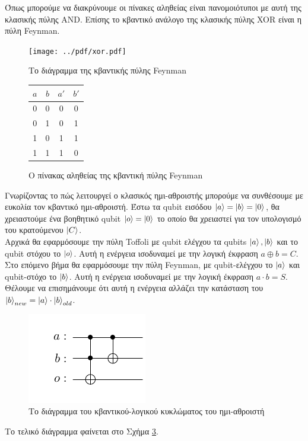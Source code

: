 Όπως μπορούμε να διακρύνουμε οι πίνακες αληθείας είναι πανομοιότυποι με
αυτή της κλασικής πύλης AND. Επίσης το κβαντικό ανάλογο της κλασικής πύλης
XOR είναι η πύλη Feynman.

\begin{figure}[ht]
    \centering
    \texttt{[image: ../pdf/xor.pdf]}
    \caption{Το διάγραμμα της κβαντικής πύλης Feynman}
    \label{fig:7}
\end{figure}

\begin{figure}[ht]
    \centering
    \begin{tabular}{c c|c c}
        $a$ & $b$ & $a'$ & $b'$ \\
        \hline
        0 & 0 & 0 & 0 \\
        0 & 1 & 0 & 1 \\
        1 & 0 & 1 & 1 \\
        1 & 1 & 1 & 0 \\
    \end{tabular}
    \caption{Ο πίνακας αληθείας της κβαντική πύλης Feynman}
    \label{fig:8}
\end{figure}

Γνωρίζοντας το πώς λειτουργεί ο κλασικός ημι-αθροιστής
μπορούμε να συνθέσουμε με ευκολία τον κβαντικό ημι-αθροιστή.
Έστω τα qubit εισόδου $\ket{a} = \ket{b} = \ket{0}$, θα χρειαστούμε
ένα βοηθητικό qubit $\ket{o} = \ket{0}$ το οποίο θα χρειαστεί για
τον υπολογισμό του κρατούμενου $\ket{C}$.\\

Αρχικά θα εφαρμόσουμε την πύλη Toffoli με qubit ελέγχου τα qubits
$\ket{a}, \ket{b}$ και το qubit στόχου το $\ket{o}$. Αυτή η ενέργεια
ισοδυναμεί με την λογική έκφραση $a \oplus b = C$.\\

Στο επόμενο βήμα θα εφαρμόσουμε την πύλη Feynman, με qubit-ελέγχου
το $\ket{a}$ και qubit-στόχο το $\ket{b}$. Αυτή η ενέργεια
ισοδυναμεί με την λογική έκφραση $a \cdot b = S$. Θέλουμε να επισημάνουμε
ότι αυτή η ενέργεια αλλάζει την κατάσταση του $\ket{b}_{new} = \ket{a} \cdot \ket{b}_{old}$.\\

\begin{figure}
    \centering
    \includegraphics{../pdf/half_adder.pdf}
    \caption{Το διάγραμμα του κβαντικού-λογικού κυκλώματος του ημι-αθροιστή}
    \label{fig:9}
\end{figure}

Το τελικό διάγραμμα φαίνεται στο Σχήμα \ref{fig:9}.

